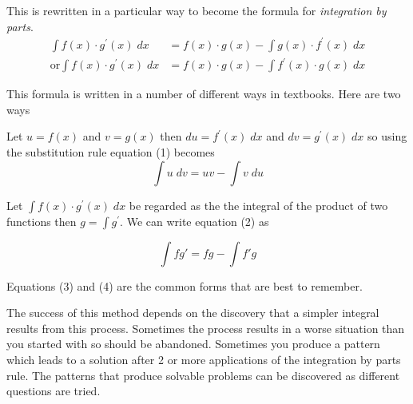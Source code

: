 This is rewritten in a particular way to become the formula for \emph{integration by parts}.
\begin{align}\int f (x) \cdot g^{ \prime } (x)\; d x &  = f (x) \cdot g (x) -\int g (x) \cdot f^{ \prime } (x)\; d x \tag{1} \\
\text{or}\int f (x) \cdot g^{ \prime } (x)\; d x &  = f (x) \cdot g (x) -\int f^{ \prime } (x) \cdot g (x)\; d x \tag{2}\end{align}

This formula is written in a number of different ways in textbooks. Here
are two ways 

Let $u =f (x)$ and $v =g (x)$ then $d u =f^{ \prime } (x)\; d x$ and $d v =g^{ \prime } (x)\; d x$ so using the substitution rule equation (1) becomes
\begin{equation}\int u\; d v =u v -\int v\; d u\tag{3}
\end{equation}

Let $\int f (x) \cdot g^{ \prime } (x)\; d x$ be regarded as the the integral of the product of two functions then $g =\int g^{ \prime }$. We can write equation (2) as
\begin{tcolorbox}
	\[\int fg'=fg-\int f'g \tag{4}\]
\end{tcolorbox}
Equations (3) and (4) are the common forms that are best to remember.

The success of this method depends on the discovery that a simpler integral results from this process. Sometimes the process results in a worse situation than you started with so should be abandoned. Sometimes you produce a pattern which leads to a solution after 2 or more applications of the integration by parts rule. The patterns that produce solvable problems can be discovered as different questions are tried. 

